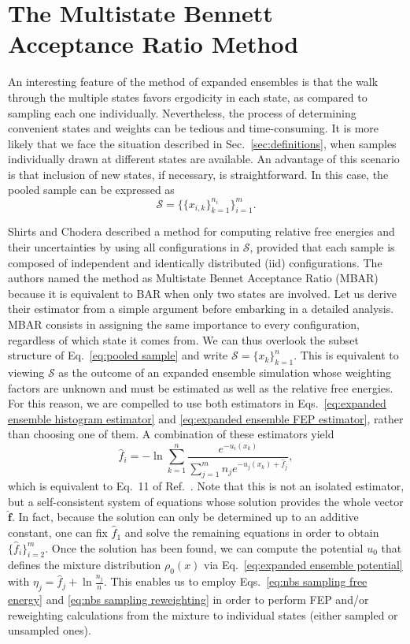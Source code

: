 \documentclass[aip,jcp,reprint,amsmath,amssymb]{revtex4-1}
\newcommand{\vt}[1]{\boldsymbol{\mathbf{#1}}}           %
\begin{document}
\section{The Multistate Bennett Acceptance Ratio Method}

An interesting feature of the method of expanded ensembles is that the walk through the multiple states favors ergodicity in each state, as compared to sampling each one individually. Nevertheless, the process of determining convenient states and weights can be tedious and time-consuming. It is more likely that we face the situation described in Sec.~\ref{sec:definitions}, when samples individually drawn at different states are available. An advantage of this scenario is that inclusion of new states, if necessary, is straightforward. In this case, the pooled sample can be expressed as
\begin{equation}
\label{eq:pooled sample}
\mathcal S = \Big\{\{x_{i,k}\}_{k=1}^{n_i}\Big\}_{i=1}^m.
\end{equation}

Shirts and Chodera\cite{Shirts_2008} described a method for computing relative free energies and their uncertainties by using all configurations in $\mathcal S$, provided that each sample is composed of independent and identically distributed (iid) configurations. The authors named the method as Multistate Bennet Acceptance Ratio (MBAR) because it is equivalent to BAR when only two states are involved. Let us derive their estimator from a simple argument before embarking in a detailed analysis. MBAR consists in assigning the same importance to every configuration, regardless of which state it comes from. We can thus overlook the subset structure of Eq.~\eqref{eq:pooled sample} and write $\mathcal S = \{x_k\}_{k=1}^n$. This is equivalent to viewing $\mathcal S$ as the outcome of an expanded ensemble simulation whose weighting factors are unknown and must be estimated as well as the relative free energies. For this reason, we are compelled to use both estimators in Eqs.~\eqref{eq:expanded ensemble histogram estimator} and \eqref{eq:expanded ensemble FEP estimator}, rather than choosing one of them. A combination of these estimators yield
\begin{equation}
\label{eq:mbar free energy estimator}
\hat f_i = -\ln \sum_{k=1}^n \frac{e^{-u_i(x_k)}}{\sum_{j=1}^m n_j e^{-u_j(x_k) + \hat f_j}},
\end{equation}
which is equivalent to Eq.~11 of Ref.~. Note that this is not an isolated estimator, but a self-consistent system of equations whose solution provides the whole vector $\hat {\vt f}$. In fact, because the solution can only be determined up to an additive constant, one can fix $\hat f_1$ and solve the remaining equations in order to obtain $\{\hat f_i\}_{i=2}^m$. Once the solution has been found, we can compute the potential $u_0$ that defines the mixture distribution $\rho_0(x)$ via Eq.~\eqref{eq:expanded ensemble potential} with $\eta_j = \hat f_j + \ln \frac{n_j}{n}$. This enables us to employ Eqs.~\eqref{eq:nbs sampling free energy} and \eqref{eq:nbs sampling reweighting} in order to perform FEP and/or reweighting calculations from the mixture to individual states (either sampled or unsampled ones).\cite{Geyer_1994, Shirts_2017}
\end{document}
